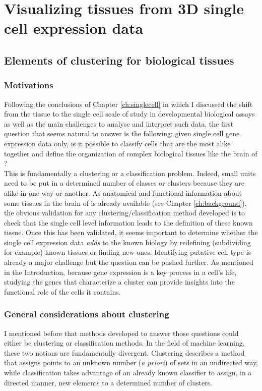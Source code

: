 \chapter{Visualizing tissues from 3D single cell expression data}\label{ch:non_spatial_clustering_visualization} 
\section{Elements of clustering for biological tissues}
	\subsection{Motivations}
	Following the conclusions of Chapter \ref{ch:singlecell} in which I discussed the shift from the tissue to the single cell scale of study in developmental biological assays as well as the main challenges to analyse and interpret such data, the first question that seems natural to answer is the following: given single cell gene expression data only, is it possible to classify cells that are the most alike together and define the organization of complex biological tissues like the brain of \platyfull{}?\\
	
	This is fundamentally a clustering or a classification problem. Indeed, small units need to be put in a determined number of classes or clusters because they are alike in one way or another. As anatomical and functional information about some tissues in the brain of \platy{} is already available (see Chapter \ref{ch:background}), the obvious validation for any clustering/classification method developed is to check that the single cell level information leads to the definition of these known tissue. Once this has been validated, it seems important to determine whether the single cell expression data \emph{adds} to the known biology by redefining (subdividing for example) known tissues or finding new ones. Identifying putative cell type is already a major challenge but the question can be pushed further. As mentioned in the Introduction, because gene expression is a key process in a cell's life, studying the genes that characterize a cluster can provide insights into the functional role of the cells it contains.

	\subsection{General considerations about clustering}
	I mentioned before that methods developed to answer those questions could either be clustering or classification methods. In the field of machine learning, these two notions are fundamentally divergent. Clustering describes a method that assigns points to an unknown number (\emph{a priori}) of sets in an undirected way, while classification takes advantage of an already known classifier to assign, in a directed manner, new elements to a determined number of clusters.\\
	
